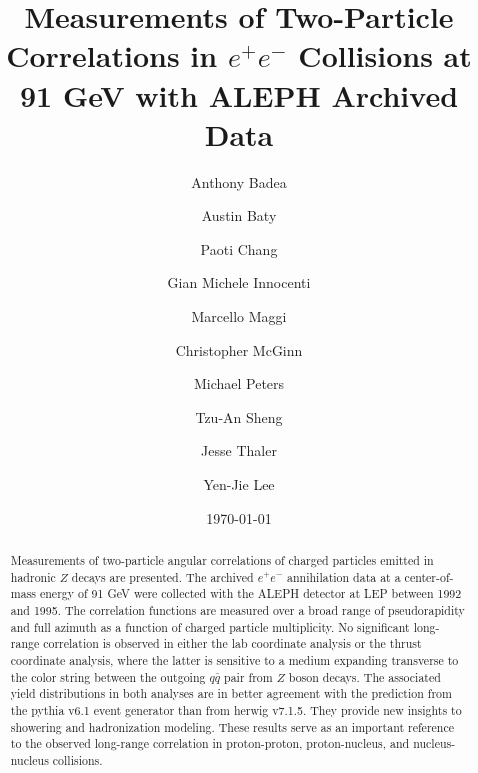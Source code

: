 \documentclass[aps,prl,twocolumn,superscriptaddress,groupedaddress]{revtex4}  %
\begin{document}
\widetext
{}

\newcommand{\pt}{$p_{\text{T}}$}

\title{Measurements of Two-Particle Correlations in $e^+e^-$ Collisions at 91 GeV with ALEPH Archived Data}

\author{Anthony Badea}
%

\author{Austin Baty}
%

\author{Paoti Chang}
%

\author{Gian Michele Innocenti}
%

\author{Marcello Maggi}
%

\author{Christopher McGinn}
%

\author{Michael Peters}
%

\author{Tzu-An Sheng}
%

\author{Jesse Thaler}
%

\author{Yen-Jie Lee}
%

\date{\today}


\begin{abstract}
Measurements of two-particle angular correlations of charged particles emitted in hadronic $Z$ decays are presented. The archived $e^+e^-$ annihilation data at a center-of-mass energy of 91 GeV were collected with the ALEPH detector at LEP between 1992 and 1995. The correlation functions are measured over a broad range of pseudorapidity and full azimuth as a function of charged particle multiplicity. No significant long-range correlation is observed in either the lab coordinate analysis or the thrust coordinate analysis, where the latter is sensitive to a medium expanding transverse to the color string between the outgoing $q\bar{q}$ pair from $Z$ boson decays. The associated yield distributions in both analyses are in better agreement with the prediction from the {\sc pythia} v6.1 event generator than from {\sc herwig} v7.1.5. They provide new insights to showering and hadronization modeling. These results serve as an important reference to the observed long-range correlation in proton-proton, proton-nucleus, and nucleus-nucleus collisions.
\end{abstract}
\end{document}
